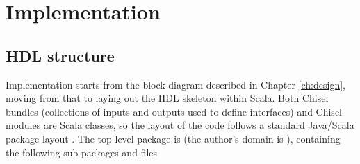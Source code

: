 \chapter{Implementation}
\label{ch:implementation}

\section{HDL structure}
Implementation starts from the block diagram described in Chapter \ref{ch:design}, moving from that to laying out the HDL skeleton within Scala. Both Chisel bundles (collections of inputs and outputs used to define interfaces) and Chisel modules are Scala classes, so the layout of the code follows a standard Java/Scala package layout \cite{scala_style}. The top-level package is  (the author's domain is ), containing the following sub-packages and files

